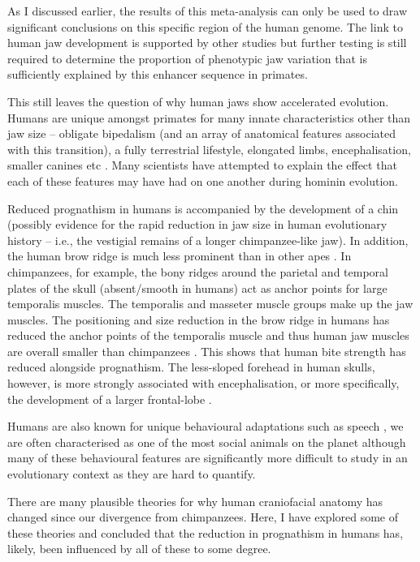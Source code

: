\documentclass{article}[12pt]
\begin{document}
As I discussed earlier, the results of this meta-analysis can only be used to draw significant conclusions on this specific region of the human genome. The link to human jaw development is supported by other studies \parencite{Mina2001} but further testing is still required to determine the proportion of phenotypic jaw variation that is sufficiently explained by this enhancer sequence in primates. 

This still leaves the question of why human jaws show accelerated evolution. Humans are unique amongst primates for many innate characteristics other than jaw size – obligate bipedalism (and an array of anatomical features associated with this transition), a fully terrestrial lifestyle, elongated limbs, encephalisation, smaller canines etc \parencite{McLean2011, OBleness2012}. Many scientists have attempted to explain the effect that each of these features may have had on one another during hominin evolution.

Reduced prognathism in humans is accompanied by the development of a chin (possibly evidence for the rapid reduction in jaw size in human evolutionary history – i.e., the vestigial remains of a longer chimpanzee-like jaw). In addition, the human brow ridge is much less prominent than in other apes \parencite{Lesciotto2019, Martinez2009}. In chimpanzees, for example, the bony ridges around the parietal and temporal plates of the skull (absent/smooth in humans) act as anchor points for large temporalis muscles. The temporalis and masseter muscle groups make up the jaw muscles. The positioning and size reduction in the brow ridge in humans has reduced the anchor points of the temporalis muscle and thus human jaw muscles are overall smaller than chimpanzees \parencite{Osorio2015, Yuan2019, jawmuscle}. This shows that human bite strength has reduced alongside prognathism. The less-sloped forehead in human skulls, however, is more strongly associated with encephalisation, or more specifically, the development of a larger frontal-lobe \parencite{Lesciotto2019, Woronowicz2019}.

Humans are also known for unique behavioural adaptations such as speech \parencite{OBleness2012}, we are often characterised as one of the most social animals on the planet although many of these behavioural features are significantly more difficult to study in an evolutionary context as they are hard to quantify.

There are many plausible theories for why human craniofacial anatomy has changed since our divergence from chimpanzees. Here, I have explored some of these theories and concluded that the reduction in prognathism in humans has, likely, been influenced by all of these to some degree.
 
\end{document}
